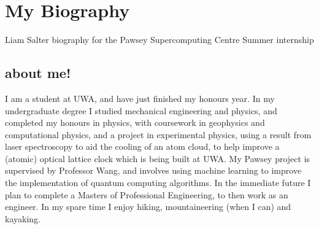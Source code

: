 \section{My Biography}
Liam Salter biography for the Pawsey Supercomputing Centre Summer internship
\subsection{about me!}
I am a student at UWA, and have just finished my honours year.  In my undergraduate degree I studied mechanical engineering and physics, and completed my honours in physics, with coursework in geophysics and computational physics, and a project in experimental physics, using a result from laser spectroscopy to aid the cooling of an atom cloud, to help improve a (atomic) optical lattice clock which is being built at UWA.  My Pawsey project is supervised by Professor Wang, and involves using machine learning to improve the implementation of quantum computing algorithms.  In the immediate future I plan to complete a Masters of Professional Engineering, to then work as an engineer.  In my spare time I enjoy hiking, mountaineering (when I can) and kayaking.   
